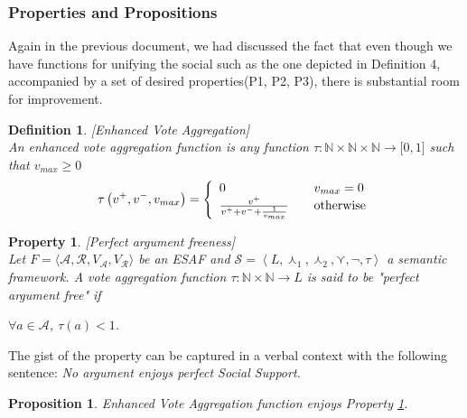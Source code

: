 \documentclass{article}
\newtheorem{definition}{Definition}
\newtheorem{property}{Property}
\newtheorem{proposition}{Proposition}
\newcommand{\nat}{\mathbb{N}}   %
\newcommand{\args}{\mathcal{A}} %
\newcommand{\att}{\mathcal{R}}  %
\newcommand{\valueset}{L}
\newcommand{\varg}{V_{\args}}   %
\newcommand{\vatt}{V_{\att}}   %
\newcommand{\safid}{F}               %
\newcommand{\saf}{\safid = \safbody} %
\newcommand{\safbody}{\langle \args, \att, \varg, \vatt \rangle} %
\newcommand{\semid}{\mathcal{S}}        %
\newcommand{\sembody}{\left\langle \valueset,\SAFand_1, \SAFand_2,\SAFor,\lnot,\tau \right\rangle}
\newcommand{\semdef}{\semid = \sembody}     %
\newcommand{\SAFand}{\curlywedge}     %
\newcommand{\SAFor}{\curlyvee}        %
\begin{document}
\subsubsection{Properties and Propositions}

Again in the previous document, we had discussed the fact that even though we have functions for unifying the social such as the one depicted in Definition 4, accompanied by a set of desired properties(P1, P2, P3), there is substantial room for improvement. 



\begin{definition}
\label{def:voteAgg}
[Enhanced Vote Aggregation]
\\ An enhanced vote aggregation function is any function
$\tau:
\mathbb{N} \times \mathbb{N} \times \mathbb{N}
\rightarrow\lbrack0,1]$ such that $v_{max}\geq0$
\[
\tau\left(  v^{+},v^{-}, v_{max}\right)  =\left\{
\begin{array}
[c]{lll}
0 &  & v_{max}=0\\
\frac{v^{+}}{v^{+}+v^{-}+\frac{1}{v_{max}}} &  & \text{otherwise}
\end{array}
\right.
\]

\end{definition}

{\color{red}
\begin{property}
\label{P1} [Perfect argument freeness] \\
Let $\saf$ be an ESAF and $\semdef$ a semantic framework. A vote aggregation function $\tau : \nat \times \nat \to L$ is said to be "perfect argument free" if
\begin{center}
$\forall a \in \mathcal{A}$, $\tau \left(a\right) < 1$. %
\end{center}
\end{property}
}

The gist of the property can be captured in a verbal context with the following sentence: \emph{No argument enjoys perfect Social Support.}  \\

\begin{proposition}
Enhanced Vote Aggregation function enjoys Property \ref{P1}.
\end{proposition}
\end{document}
